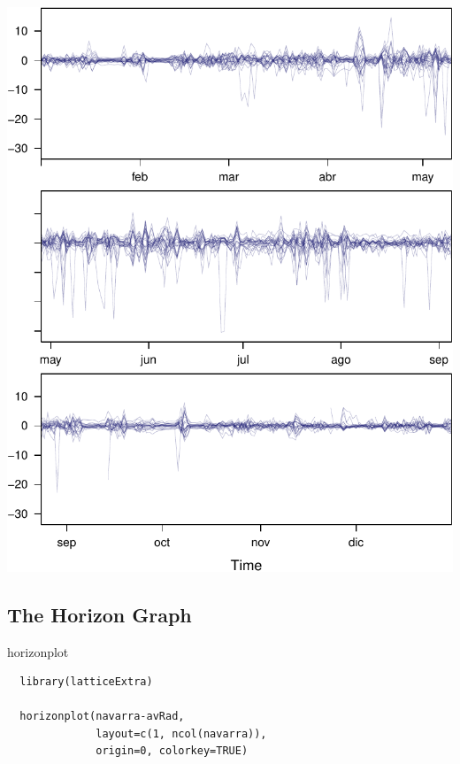\documentclass[xcolor={usenames,svgnames,dvipsnames}]{beamer}
\begin{document}
\begin{frame}[label=sec-3-2-2]{}
\includegraphics[width=.9\linewidth]{figs/navarraBanking.pdf}
\end{frame}


\subsection{The Horizon Graph}
\label{sec-3-3}

\begin{frame}[fragile,label=sec-3-3-1]{horizonplot}
 \lstset{language=R,label= ,caption= ,numbers=none}
\begin{lstlisting}
  library(latticeExtra)
  
  horizonplot(navarra-avRad,
              layout=c(1, ncol(navarra)),
              origin=0, colorkey=TRUE)
\end{lstlisting}
\end{frame}
\end{document}
